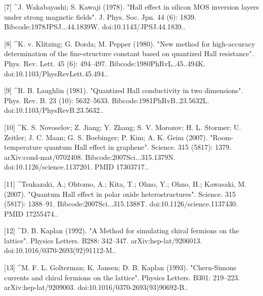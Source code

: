 [7]
^J. Wakabayashi; S. Kawaji (1978). "Hall effect in silicon MOS inversion layers under strong magnetic fields". J. Phys. Soc. Jpn. 44 (6): 1839. Bibcode:1978JPSJ...44.1839W. doi:10.1143/JPSJ.44.1839..

[8]
^K. v. Klitzing; G. Dorda; M. Pepper (1980). "New method for high-accuracy determination of the fine-structure constant based on quantized Hall resistance". Phys. Rev. Lett. 45 (6): 494–497. Bibcode:1980PhRvL..45..494K. doi:10.1103/PhysRevLett.45.494..

[9]
^R. B. Laughlin (1981). "Quantized Hall conductivity in two dimensions". Phys. Rev. B. 23 (10): 5632–5633. Bibcode:1981PhRvB..23.5632L. doi:10.1103/PhysRevB.23.5632..

[10]
^K. S. Novoselov; Z. Jiang; Y. Zhang; S. V. Morozov; H. L. Stormer; U. Zeitler; J. C. Maan; G. S. Boebinger; P. Kim; A. K. Geim (2007). "Room-temperature quantum Hall effect in graphene". Science. 315 (5817): 1379. arXiv:cond-mat/0702408. Bibcode:2007Sci...315.1379N. doi:10.1126/science.1137201. PMID 17303717..

[11]
^Tsukazaki, A.; Ohtomo, A.; Kita, T.; Ohno, Y.; Ohno, H.; Kawasaki, M. (2007). "Quantum Hall effect in polar oxide heterostructures". Science. 315 (5817): 1388–91. Bibcode:2007Sci...315.1388T. doi:10.1126/science.1137430. PMID 17255474..

[12]
^D. B. Kaplan (1992). "A Method for simulating chiral fermions on the lattice". Physics Letters. B288: 342–347. arXiv:hep-lat/9206013. doi:10.1016/0370-2693(92)91112-M..

[13]
^M. F. L. Golterman; K. Jansen; D. B. Kaplan (1993). "Chern-Simons currents and chiral fermions on the lattice". Physics Letters. B301: 219–223. arXiv:hep-lat/9209003. doi:10.1016/0370-2693(93)90692-B..